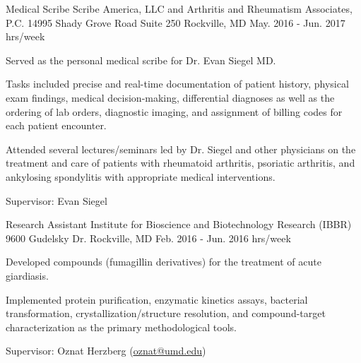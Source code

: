 \begin{cventries}
  \cventry
    {Medical Scribe} %
    {Scribe America, LLC and Arthritis and Rheumatism Associates, P.C.} %
    {14995 Shady Grove Road \newline Suite 250 \newline Rockville, MD} %
    {May. 2016 - Jun. 2017  hrs/week} %
    {
      \begin{cvitems} %
        \item {Served as the personal medical scribe for Dr. Evan Siegel MD.}
        \item{Tasks included precise and real-time documentation of patient history, physical exam findings, medical decision-making, differential diagnoses as well as the ordering of lab orders, diagnostic imaging, and assignment of billing codes for each patient encounter.}
        \item{Attended several lectures/seminars led by Dr. Siegel and other physicians on the treatment and care of patients with rheumatoid arthritis, psoriatic arthritis, and ankylosing spondylitis with appropriate medical interventions.}
        \item{Supervisor: Evan Siegel}
      \end{cvitems}
    }

  \cventry
    {Research Assistant} %
    {Institute for Bioscience and Biotechnology Research (IBBR) } %
    {9600 Gudelsky Dr. \newline
Rockville, MD} %
    {Feb. 2016 - Jun. 2016  hrs/week} %
    {
      \begin{cvitems} %
        \item {Developed compounds (fumagillin derivatives) for the treatment of acute giardiasis.}
        \item{Implemented protein purification, enzymatic kinetics assays, bacterial transformation, crystallization/structure resolution, and compound-target characterization as the primary methodological tools.}
        \item{Supervisor: Oznat Herzberg (\textcolor{navyblue}{
        {\underline{\href{mailto:oznat@umd.edu}{oznat@umd.edu}}}})}
      \end{cvitems}
    }


\end{cventries}
